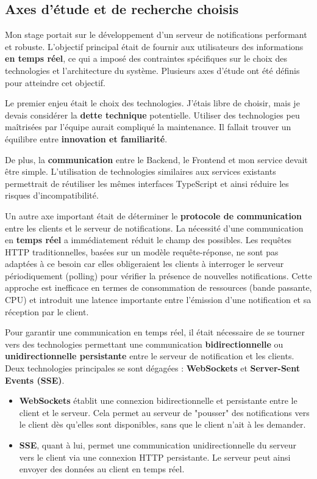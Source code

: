 \subsection{Axes d'étude et de recherche choisis}

Mon stage portait sur le développement d'un serveur de notifications performant
et robuste. L'objectif principal était de fournir aux utilisateurs des
informations {\bf en temps réel}, ce qui a imposé des contraintes spécifiques
sur le choix des technologies et l'architecture du système. Plusieurs axes
d'étude ont été définis pour atteindre cet objectif.

Le premier enjeu était le choix des technologies. J'étais libre de choisir,
mais je devais considérer la {\bf dette technique} potentielle. Utiliser des
technologies peu maîtrisées par l'équipe aurait compliqué la maintenance. Il
fallait trouver un équilibre entre {\bf innovation et familiarité}.

De plus, la {\bf communication} entre le Backend, le Frontend et mon service
devait être simple. L'utilisation de technologies similaires aux services
existants permettrait de réutiliser les mêmes interfaces TypeScript et ainsi
réduire les risques d'incompatibilité.

Un autre axe important était de déterminer le {\bf protocole de communication}
entre les clients et le serveur de notifications. La nécessité d'une
communication en {\bf temps réel} a immédiatement réduit le champ des possibles.
Les requêtes HTTP traditionnelles, basées sur un modèle requête-réponse, ne
sont pas adaptées à ce besoin car elles obligeraient les clients à interroger
le serveur périodiquement (polling) pour vérifier la présence de nouvelles
notifications. Cette approche est inefficace en termes de consommation de
ressources (bande passante, CPU) et introduit une latence importante entre
l'émission d'une notification et sa réception par le client.

Pour garantir une communication en temps réel, il était nécessaire de se tourner
vers des technologies permettant une communication {\bf bidirectionnelle} ou
{\bf unidirectionnelle persistante} entre le serveur de notification et les
clients. Deux technologies principales se sont dégagées : {\bf WebSockets} et
{\bf Server-Sent Events (SSE)}.

\begin{itemize}
	\item {\bf WebSockets} établit une connexion bidirectionnelle et persistante
entre le client et le serveur.  Cela permet au serveur de "pousser" des
notifications vers le client dès qu'elles sont disponibles, sans que le client
n'ait à les demander.
	\item {\bf SSE}, quant à lui, permet une communication unidirectionnelle du
serveur vers le client via une connexion HTTP persistante. Le serveur peut ainsi
envoyer des données au client en temps réel.
\end{itemize}

